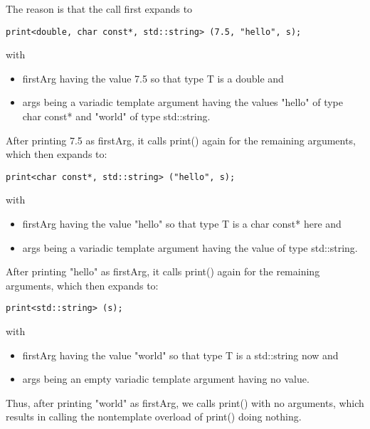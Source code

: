 The reason is that the call first expands to

\begin{lstlisting}[style=styleCXX]
print<double, char const*, std::string> (7.5, "hello", s);
\end{lstlisting}

with

\begin{itemize}
\item 
firstArg having the value 7.5 so that type T is a double and

\item 
args being a variadic template argument having the values "hello" of type char const* and "world" of type std::string.
\end{itemize}

After printing 7.5 as firstArg, it calls print() again for the remaining arguments, which then expands to:

\begin{lstlisting}[style=styleCXX]
print<char const*, std::string> ("hello", s);
\end{lstlisting}

with

\begin{itemize}
\item 
firstArg having the value "hello" so that type T is a char const* here and

\item 
args being a variadic template argument having the value of type std::string.
\end{itemize}

After printing "hello" as firstArg, it calls print() again for the remaining arguments, which then expands to:

\begin{lstlisting}[style=styleCXX]
print<std::string> (s);
\end{lstlisting}

with

\begin{itemize}
\item 
firstArg having the value "world" so that type T is a std::string now and

\item 
args being an empty variadic template argument having no value.
\end{itemize}

Thus, after printing "world" as firstArg, we calls print() with no arguments, which results in calling the nontemplate overload of print() doing nothing.

